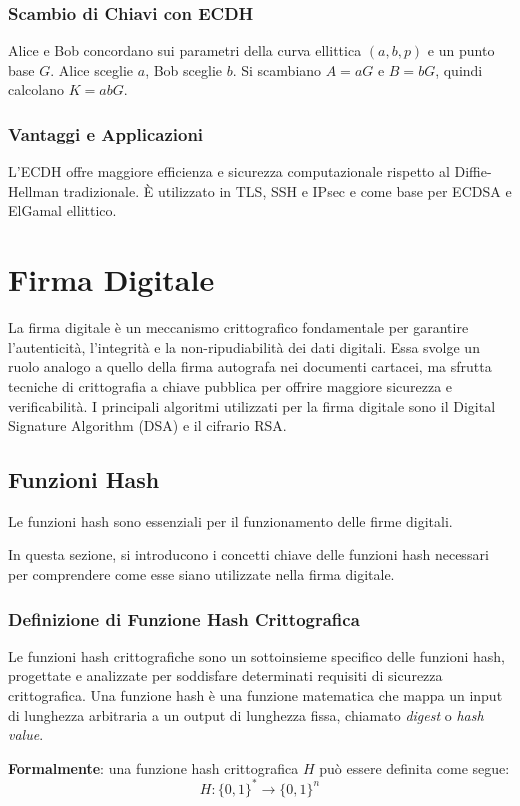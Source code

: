 \documentclass[a4paper,12pt]{report}
\begin{document}
\subsection*{Scambio di Chiavi con ECDH}
Alice e Bob concordano sui parametri della curva ellittica $(a, b, p)$ e un punto base $G$. Alice sceglie $a$, Bob sceglie $b$. Si scambiano $A = aG$ e $B = bG$, quindi calcolano $K = abG$.

\subsection*{Vantaggi e Applicazioni}
L'ECDH offre maggiore efficienza e sicurezza computazionale rispetto al Diffie-Hellman tradizionale. È utilizzato in TLS, SSH e IPsec e come base per ECDSA e ElGamal ellittico.

%
%
%
%
%
%
\chapter{Firma Digitale}
La firma digitale è un meccanismo crittografico fondamentale per garantire l'autenticità, l'integrità e la non-ripudiabilità dei dati digitali. Essa svolge un ruolo analogo a quello della firma autografa nei documenti cartacei, ma sfrutta tecniche di crittografia a chiave pubblica per offrire maggiore sicurezza e verificabilità. I principali algoritmi utilizzati per la firma digitale sono il Digital Signature Algorithm (DSA) e il cifrario RSA.
\section{Funzioni Hash}
Le funzioni hash sono essenziali per il funzionamento delle firme digitali.

In questa sezione, si introducono i concetti chiave delle funzioni hash necessari per comprendere come esse siano utilizzate nella firma digitale.

\subsection*{Definizione di Funzione Hash Crittografica}
Le funzioni hash crittografiche sono un sottoinsieme specifico delle funzioni hash, progettate e analizzate per soddisfare determinati requisiti di sicurezza crittografica. 
Una funzione hash è una funzione matematica che mappa un input di lunghezza arbitraria a un output di lunghezza fissa, chiamato \textit{digest} o \textit{hash value}.

\textbf{Formalmente}: una funzione hash crittografica $H$ può essere definita come segue:
\[H: \{0,1\}^* \rightarrow \{0,1\}^n\]
\end{document}
